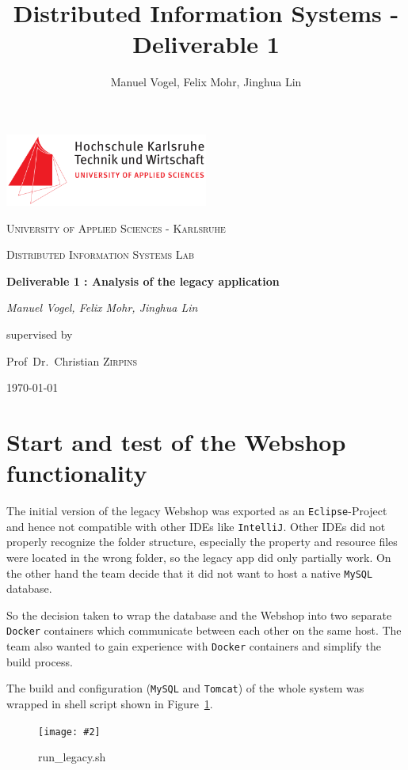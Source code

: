 \documentclass[11pt]{article}
\title{Distributed Information Systems - Deliverable 1}
\author{Manuel Vogel, Felix Mohr, Jinghua Lin}
\newcommand{\cgraphic}[3]
{
	\begin{figure}[!ht]
		\begin{center}
		\texttt{[image: \#2]}
		\end{center}
		\caption{#3}
		\label{fig:#2}
	\end{figure}
}%
\begin{document}
	\begin{titlepage}
		\centering
		\includegraphics[width=0.5\textwidth]{hska-logo}\par\vspace{1cm}
		{\scshape\LARGE University of Applied Sciences - Karlsruhe \par}
		\vspace{1cm}
		{\scshape\Large Distributed Information Systems Lab\par}
		\vspace{1.5cm}
		{\huge\bfseries Deliverable 1 : Analysis of the legacy application\par}
		\vspace{2cm}
		{\Large\itshape Manuel Vogel, Felix Mohr,  Jinghua Lin\par}
		\vfill
		supervised by\par
		Prof~Dr.~Christian \textsc{Zirpins}
		\vfill
		{\large \today\par}
	\end{titlepage}
	
	\section{Start and test of the Webshop functionality}
	The initial version of the legacy Webshop was exported as an \texttt{Eclipse}-Project and hence not compatible with other IDEs like \texttt{IntelliJ}. Other IDEs did not properly recognize the folder structure, especially the property and resource files were located in the wrong folder, so the legacy app did only partially work. On the other hand the team decide that it did not want to host a native \texttt{MySQL} database.
	
	So the decision taken to wrap the database and the Webshop into two separate \texttt{Docker} containers which communicate between each other on the same host. The team also wanted to gain experience with \texttt{Docker} containers and simplify the build process.

	The build and configuration (\texttt{MySQL} and \texttt{Tomcat}) of the whole system was wrapped in shell script shown in Figure~\ref{fig:legacy-sh}.
	\cgraphic{0.8\textwidth}{legacy-sh}{run\_legacy.sh}
	
\end{document}
